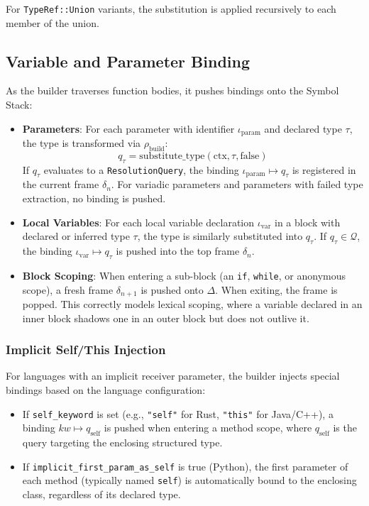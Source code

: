 For \texttt{TypeRef::Union} variants, the substitution is applied
recursively to each member of the union.

\subsection{Variable and Parameter Binding}

As the builder traverses function bodies, it pushes bindings onto the
Symbol Stack:

\begin{itemize}
  \item \textbf{Parameters}: For each parameter with identifier
    $\iota_{\text{param}}$ and declared type $\tau$,
    the type is transformed via $\rho_{\text{build}}$:
    $$q_\tau = \text{substitute\_type}(\text{ctx}, \tau, \text{false})$$
    If $q_\tau$ evaluates to a \texttt{ResolutionQuery}, the binding
    $\iota_{\text{param}} \mapsto q_\tau$
    is registered in the current frame $\delta_n$. For variadic
    parameters and parameters with failed type extraction,
    no binding is pushed.
  \item \textbf{Local Variables}: For each local variable declaration
    $\iota_{\text{var}}$
    in a block with declared or inferred type $\tau$, the type is
    similarly substituted into $q_\tau$.
    If $q_\tau \in \mathcal{Q}$, the binding $\iota_{\text{var}}
    \mapsto q_\tau$ is pushed into the top frame $\delta_n$.
  \item \textbf{Block Scoping}: When entering a sub-block (an
    \texttt{if}, \texttt{while}, or anonymous scope), a fresh frame
    $\delta_{n+1}$ is
    pushed onto $\Delta$. When exiting, the frame is popped. This
    correctly models
    lexical scoping, where a variable declared in an inner block
    shadows one in an outer block but does not outlive it.
\end{itemize}

\subsubsection{Implicit Self/This Injection}

For languages with an implicit receiver parameter, the builder
injects special bindings based on the language configuration:
\begin{itemize}
  \item If \texttt{self\_keyword} is set (e.g., \texttt{"self"} for
    Rust, \texttt{"this"} for Java/C++), a binding $kw \mapsto q_{\text{self}}$
    is pushed when entering a method scope, where $q_{\text{self}}$
    is the query targeting
    the enclosing structured type.
  \item If \texttt{implicit\_first\_param\_as\_self} is true
    (Python), the first parameter of each method (typically named
    \texttt{self}) is automatically bound to the enclosing class,
    regardless of its declared type.
\end{itemize}

